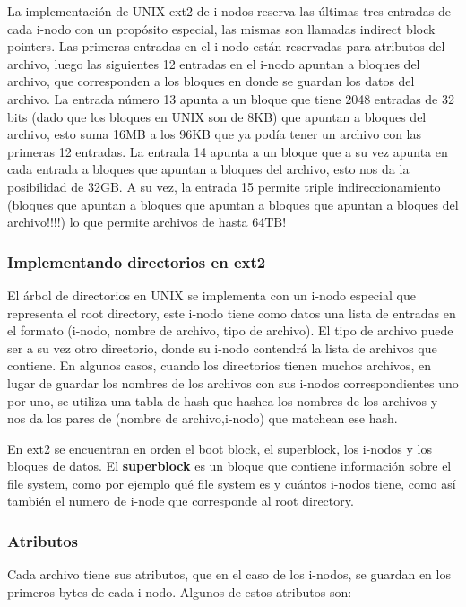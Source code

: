 \documentclass{article}
\begin{document}
La implementaci\'on de UNIX ext2 de i-nodos reserva las últimas tres entradas de cada i-nodo con un propósito especial, las mismas son llamadas indirect block pointers. Las primeras entradas en el i-nodo están reservadas para atributos del archivo, luego las siguientes 12 entradas en el i-nodo apuntan a bloques del archivo, que corresponden a los bloques en donde se guardan los datos del archivo. La entrada n\'umero 13 apunta a un bloque que tiene 2048 entradas de 32 bits (dado que los bloques en UNIX son de 8KB) que apuntan a bloques del archivo, esto suma 16MB a los 96KB que ya pod\'ia tener un archivo con las primeras 12 entradas. La entrada 14 apunta a un bloque que a su vez apunta en cada entrada a bloques que apuntan a bloques del archivo, esto nos da la posibilidad de 32GB. A su vez, la entrada 15 permite triple indireccionamiento (bloques que apuntan a bloques que apuntan a bloques que apuntan a bloques del archivo!!!!) lo que permite archivos de hasta 64TB!

\subsubsection{Implementando directorios en ext2}

El \'arbol de directorios en UNIX se implementa con un i-nodo especial que representa el root directory, este i-nodo tiene como datos una lista de entradas en el formato (i-nodo, nombre de archivo, tipo de archivo). El tipo de archivo puede ser a su vez otro directorio, donde su i-nodo contendrá la lista de archivos que contiene. En algunos casos, cuando los directorios tienen muchos archivos, en lugar de guardar los nombres de los archivos con sus i-nodos correspondientes uno por uno, se utiliza una tabla de hash que hashea los nombres de los archivos y nos da los pares de (nombre de archivo,i-nodo) que matchean ese hash.

En ext2 se encuentran en orden el boot block, el superblock, los i-nodos y los bloques de datos. El \textbf{superblock} es un bloque que contiene informaci\'on sobre el file system, como por ejemplo qu\'e file system es y cu\'antos i-nodos tiene, como así también el numero de i-node que corresponde al root directory.

\subsubsection{Atributos}

Cada archivo tiene sus atributos, que en el caso de los i-nodos, se guardan en los primeros bytes de cada i-nodo. Algunos de estos atributos son:
\end{document}
